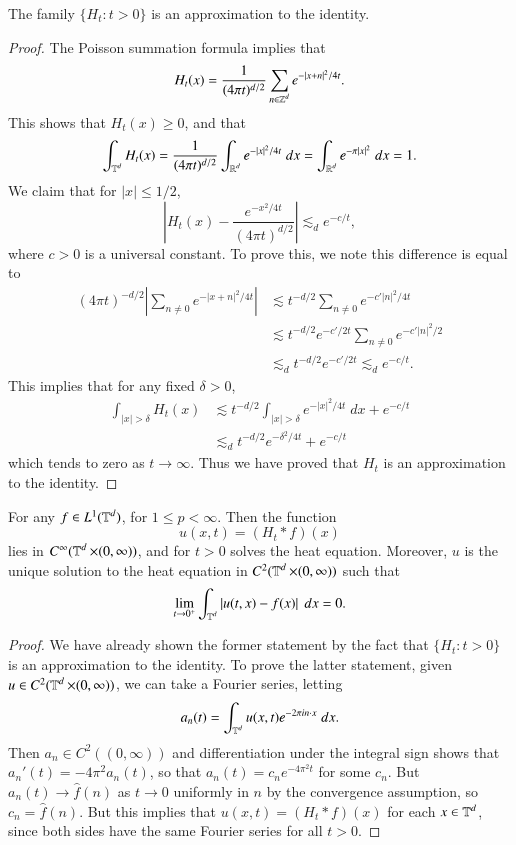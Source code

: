 \begin{lemma}
    The family $\{ H_t : t > 0 \}$ is an approximation to the identity.
\end{lemma}
\begin{proof}
    The Poisson summation formula implies that
    \[ H_t(x) = \frac{1}{(4 \pi t)^{d/2}} \sum_{n \in \operatorname{\mathbb{Z}}^d} e^{- |x + n|^2 / 4 t}. \]
    This shows that $H_t(x) \geq 0$, and that
    \[ \int_{\operatorname{\mathbb{T}}^d} H_t(x) = \frac{1}{(4 \pi t)^{d/2}} \int_{\operatorname{\mathbb{R}}^d} e^{-|x|^2/4 t}\; dx = \int_{\operatorname{\mathbb{R}}^d} e^{-\pi |x|^2}\; dx = 1. \]
    We claim that for $|x| \leq 1/2$,
    \[ \left| H_t(x) - \frac{e^{- x^2/4t}}{(4 \pi t)^{d/2}} \right| \lesssim_d e^{-c/t}, \]
    where $c > 0$ is a universal constant. To prove this, we note this difference is equal to
    \begin{align*}
        (4 \pi t)^{-d/2} \left| \sum_{n \neq 0} e^{- |x + n|^2 / 4t} \right| &\lesssim t^{-d/2} \sum_{n \neq 0} e^{-c' |n|^2 / 4t}\\
        &\lesssim t^{-d/2} e^{-c'/2t} \sum_{n \neq 0} e^{-c'|n|^2/2}\\
        &\lesssim_d t^{-d/2} e^{-c'/2t} \lesssim_d e^{-c/t}.
    \end{align*}
    This implies that for any fixed $\delta > 0$,
    \begin{align*}
        \int_{|x| > \delta} H_t(x) &\lesssim t^{-d/2} \int_{|x| > \delta} e^{-|x|^2/4t}\; dx + e^{-c/t}\\
        &\lesssim_d t^{-d/2} e^{-\delta^2/4t} + e^{-c/t}
    \end{align*}
    which tends to zero as $t \to \infty$. Thus we have proved that $H_t$ is an approximation to the identity.
\end{proof}

\begin{theorem}
    For any $f \in L^1(\operatorname{\mathbb{T}}^d)$, for $1 \leq p < \infty$. Then the function
    \[ u(x,t) = (H_t * f)(x) \]
    lies in $C^\infty(\operatorname{\mathbb{T}}^d \times (0,\infty))$, and for $t > 0$ solves the heat equation. Moreover, $u$ is the unique solution to the heat equation in $C^2(\operatorname{\mathbb{T}}^d \times (0,\infty))$ such that
    \[ \lim_{t \to 0^+} \int_{\operatorname{\mathbb{T}}^d} \left| u(t,x) - f(x) \right|\; dx = 0. \]
\end{theorem}
\begin{proof}
    We have already shown the former statement by the fact that $\{ H_t : t > 0 \}$ is an approximation to the identity. To prove the latter statement, given $u \in C^2(\operatorname{\mathbb{T}}^d \times (0,\infty))$, we can take a Fourier series, letting
    \[ a_n(t) = \int_{\operatorname{\mathbb{T}}^d} u(x,t) e^{-2 \pi i n \cdot x}\; dx. \]
    Then $a_n \in C^2((0,\infty))$ and differentiation under the integral sign shows that $a_n'(t) = -4\pi^2 a_n(t)$, so that $a_n(t) = c_n e^{- 4 \pi^2 t}$ for some $c_n$. But $a_n(t) \to \widehat{f}(n)$ as $t \to 0$ uniformly in $n$ by the convergence assumption, so $c_n = \widehat{f}(n)$. But this implies that $u(x,t) = (H_t * f)(x)$ for each $x \in \operatorname{\mathbb{T}}^d$, since both sides have the same Fourier series for all $t > 0$.
\end{proof}


